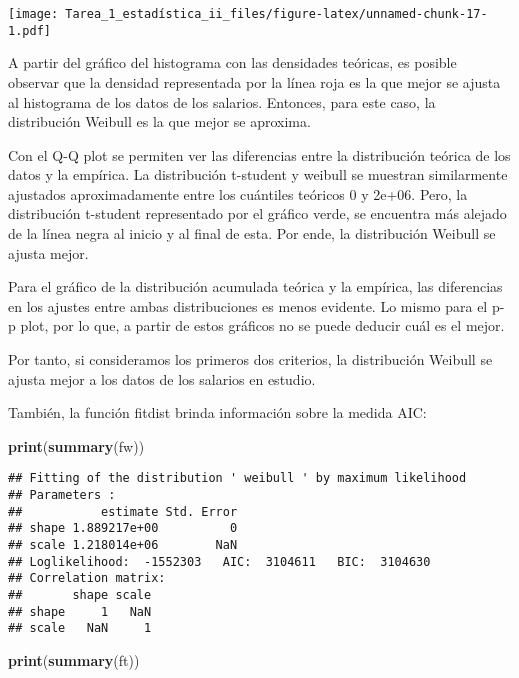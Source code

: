 \documentclass[
]{article}
\newenvironment{Shaded}{\begin{snugshade}}{\end{snugshade}}
\newcommand{\FunctionTok}[1]{\textcolor[rgb]{0.13,0.29,0.53}{\textbf{#1}}}
\newcommand{\NormalTok}[1]{#1}
\begin{document}
\texttt{[image: Tarea\_1\_estadística\_ii\_files/figure-latex/unnamed-chunk-17-1.pdf]}

A partir del gráfico del histograma con las densidades teóricas, es
posible observar que la densidad representada por la línea roja es la
que mejor se ajusta al histograma de los datos de los salarios.
Entonces, para este caso, la distribución Weibull es la que mejor se
aproxima.

Con el Q-Q plot se permiten ver las diferencias entre la distribución
teórica de los datos y la empírica. La distribución t-student y weibull
se muestran similarmente ajustados aproximadamente entre los cuántiles
teóricos 0 y 2e+06. Pero, la distribución t-student representado por el
gráfico verde, se encuentra más alejado de la línea negra al inicio y al
final de esta. Por ende, la distribución Weibull se ajusta mejor.

Para el gráfico de la distribución acumulada teórica y la empírica, las
diferencias en los ajustes entre ambas distribuciones es menos evidente.
Lo mismo para el p-p plot, por lo que, a partir de estos gráficos no se
puede deducir cuál es el mejor.

Por tanto, si consideramos los primeros dos criterios, la distribución
Weibull se ajusta mejor a los datos de los salarios en estudio.

También, la función fitdist brinda información sobre la medida AIC:

\begin{Shaded}
\begin{Highlighting}[]
\FunctionTok{print}\NormalTok{(}\FunctionTok{summary}\NormalTok{(fw))}
\end{Highlighting}
\end{Shaded}

\begin{verbatim}
## Fitting of the distribution ' weibull ' by maximum likelihood 
## Parameters : 
##           estimate Std. Error
## shape 1.889217e+00          0
## scale 1.218014e+06        NaN
## Loglikelihood:  -1552303   AIC:  3104611   BIC:  3104630 
## Correlation matrix:
##       shape scale
## shape     1   NaN
## scale   NaN     1
\end{verbatim}

\begin{Shaded}
\begin{Highlighting}[]
\FunctionTok{print}\NormalTok{(}\FunctionTok{summary}\NormalTok{(ft))}
\end{Highlighting}
\end{Shaded}
\end{document}
